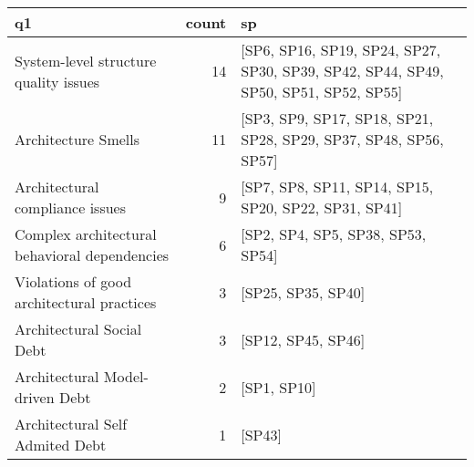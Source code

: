 \begin{tabular}{lrl}
\toprule
                                            q1 &  count &                                                                                   sp \\
\midrule
         System-level structure quality issues &     14 &  [SP6, SP16, SP19, SP24, SP27, SP30, SP39, SP42, SP44, SP49, SP50, SP51, SP52, SP55] \\
                           Architecture Smells &     11 &                     [SP3, SP9, SP17, SP18, SP21, SP28, SP29, SP37, SP48, SP56, SP57] \\
               Architectural compliance issues &      9 &                                 [SP7, SP8, SP11, SP14, SP15, SP20, SP22, SP31, SP41] \\
 Complex architectural behavioral dependencies &      6 &                                                    [SP2, SP4, SP5, SP38, SP53, SP54] \\
    Violations of good architectural practices &      3 &                                                                   [SP25, SP35, SP40] \\
                     Architectural Social Debt &      3 &                                                                   [SP12, SP45, SP46] \\
               Architectural Model-driven Debt &      2 &                                                                          [SP1, SP10] \\
               Architectural Self Admited Debt &      1 &                                                                               [SP43] \\
\bottomrule
\end{tabular}
